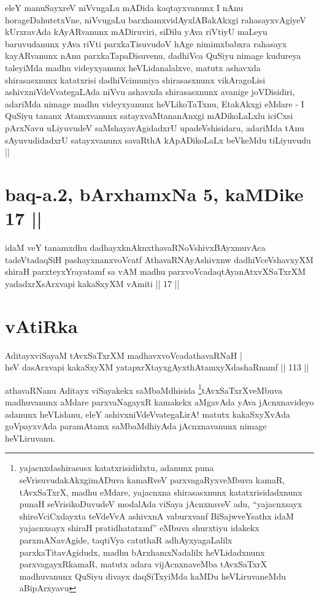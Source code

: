 \begin{artha}
eleY manuSayxreV niVvugaLu mADida kaqtayxvanunx I nAnu
horageDahutetxVne, niVvugaLu barxhamxvidAyxlABakAkxgi rahasayxvAgiyeV
kUrxravAda kAyARvanunx mADi\-ruviri, siDilu yAva riVtiyU maLeyu
baruvudanunx yAva riVti parxkaTisu\-vudoV hAge nimimxbabxra rahasayx
kayARvanunx nAnu parxkaTapaDisuvenu, dadhiVca QuSiyu nimage kudureya
taleyiMda madhu videyxyanunx heVLidanalalxve, matutx ashavxda
shirasasxnunx katatxrisi dadhiVcimuniya shirasasxnunx vikAragoLisi
ashivxniVdeVvate\-gaLAda niVvu ashavxda shirasasxnunx avanige
joVDisidiri, adariMda nimage madhu videyxyanunx heVLikoTaTxnu,
EtakAkxgi eMdare - I QuSiyu tananx Atamxvanunx satayxvaMtananAnxgi
mADikoLaLxlu iciCxsi pArxNavu uLiyuvudeV saMshayavAgidadxrU
upadeVshisidaru, adariMda tAnu sAyuvudidadxrU satayxvanunx savaRthA
kApADikoLaLx beVkeMdu tiLiyuvudu ||
\end{artha}

\section*{baq-a.2, bArxhamxNa 5, kaMDike 17 ||}

\begin{shl}
idaM veY tanamxdhu dadhayxknAknxthavaRNoV\s shivxBAyxmuvAca tadeVtadaqSiH pashayxnanxvoVcatf AthavaRNAyAshivxnw dadhiVceV\s shavxyXM shiraH parxteyxYrayatamf sa vAM madhu parxvoVcadaqtAyanAtxvXSaTxrXM yadadxrXsArxvapi kakaSxyXM vAmiti || 17 ||
\end{shl}

\section*{vAtiRka}

\begin{shl}
AditayxviSayaM tAvxSaTxrXM madhavxvoVcadathavaRNaH |\\
heV dasArxvapi kakaSxyXM yatapxrXtayxgAyxthAtamxyXdashaRnamf \hfill || 113 ||
\end{shl}

\begin{artha}
athavaRNanu Aditayx viSayakekx
saMbaMdhisida \footnote[1]{yajacnxdashirasusx katatxrisididxtu,
  adanunx puna seVrisuvudakAkxgimADuva kamaRveV parxvagaRyxveMbuva
  kamaR, tAvxSaTxrX, madhu eMdare, yajacnxna shirasasxnunx
  katatxrisidadxnunx punaH seVrisikoDuvudeV modalAda viSaya
  jAcnxnaveV adu, ``yajacnxsayx shiroV\s ciCxdayxta teVdeVvA ashivxnA vaburxvanf BiSajwveYsathx idaM yajacnxsayx shiraH pratidhatatxmf'' eMbuva shurxtiyu idakekx parxmANavAgide,
  taqtiVya catuthaR adhAyxyagaLalilx parxkaTitavAgidudx, madhu
  bArxhamxNadalilx heVLidadxnunx parxvagayxRkamaR, matutx adara
  vijAcnxnaveMba tAvxSaTxrX madhuvanunx QuSiyu divayx daqSiTxyiMda
  kaMDu heVLiruvaneMdu aBipArxyavu}tAvxSaTxrXveMbuva madhuvanunx \break aMdare
parxvaNagayxR kamakekx aMgavAda yAva jAcnxnavideyo adanunx heVLidanu,
eleY ashivxniVdeVvategaLirA! matutx kakaSxyXvAda goVpayxvAda
paramAtamx saMbaMdhi\-yAda jAcnxnavanunx nimage heVLiruvanu.
\end{artha}

